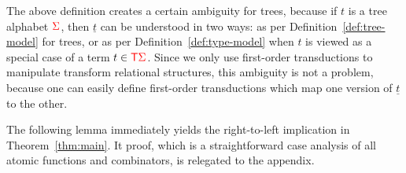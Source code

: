 The above  definition creates a certain ambiguity for trees, because if $t$ is a tree alphabet ${\color{red}{\Sigma}}$, then $\underline t$ can be understood in two ways: as per  Definition~\ref{def:tree-model} for trees, or as per Definition~\ref{def:type-model} when $t$ is viewed as a special case of a term $t \in {\color{red}{\mathsf T}} {\color{red}{\Sigma}}$. Since we only use first-order transductions to manipulate transform relational structures,  this ambiguity is not a problem, because one can easily define first-order transductions which map one version of $\underline t$ to the other.

The following lemma immediately yields the right-to-left implication in Theorem~\ref{thm:main}. It proof, which is a straightforward case analysis of all atomic functions and combinators, is relegated to the appendix. 

\newcommand{\vocline}[3]{\\ $#1$ & $#2$ & \begin{minipage}{0,6\textwidth}
    #3
\end{minipage}\\}

